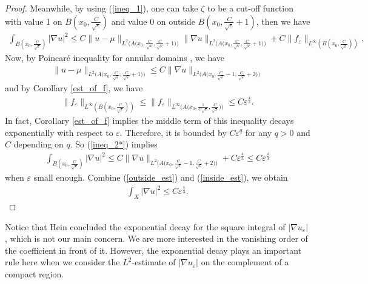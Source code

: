 \documentclass[11pt]{amsart}
\theoremstyle{plain}
\theoremstyle{definition}
\numberwithin{equation}{section}
\renewcommand{\leq}{\leqslant}
\begin{document}
\begin{proof}
Meanwhile, by using (\ref{ineq_1}), one can take $\zeta$ to be a cut-off function with value 1 on $B(x_0,\frac{C}{\sqrt{\varepsilon}})$ and value 0 on outside $B(x_0,\frac{C}{\sqrt{\varepsilon}}+1)$, then we have 
\begin{align}\label{ineq_2*}
\int_{B(x_0,\frac{C}{\sqrt{\varepsilon}})}|\nabla u|^2\leq C\|u-\mu\|_{L^2\big(A\big(x_0,\frac{C}{\sqrt{\varepsilon}},\frac{C}{\sqrt{\varepsilon}}+1\big)\big)}\|\nabla u\|_{L^2\big(A\big(x_0,\frac{C}{\sqrt{\varepsilon}},\frac{C}{\sqrt{\varepsilon}}+1\big)\big)}+C\|f_{\varepsilon}\|_{L^{\infty}(B(x_0,\frac{C}{\sqrt{\varepsilon}}))}.
\end{align}
Now, by Poincar\'e inequality for annular domains \cite[Lemma 2.2]{Hein}, we have
\begin{align}
\|u-\mu\|_{L^2\big(A\big(x_0,\frac{C}{\sqrt{\varepsilon}},\frac{C}{\sqrt{\varepsilon}}+1\big)\big)}\leq C\|\nabla u\|_{L^2\big(A\big(x_0,\frac{C}{\sqrt{\varepsilon}}-1,\frac{C}{\sqrt{\varepsilon}}+2\big)\big)}
\end{align}
and by Corollary \ref{est_of_f}, we have
\begin{align}
\|f_{\varepsilon}\|_{L^{\infty}(B(x_0,\frac{C}{\sqrt{\varepsilon}}))}\leq \|f_{\varepsilon}\|_{L^{\infty}\big(A\big(x_0,\frac{1}{C\sqrt{\varepsilon}},\frac{C}{\sqrt{\varepsilon}}\big)\big)}\leq C\varepsilon^{\frac{4}{3}}.
\end{align}
In fact, Corollary \ref{est_of_f} implies the middle term of this inequality decays exponentially with respect to $\varepsilon$. Therefore, it is bounded by $C\varepsilon^q$ for any $q>0$ and $C$ depending on $q$.
So (\ref{ineq_2*}) implies
\begin{align}\label{inside_est}
\int_{B(x_0,\frac{C}{\sqrt{\varepsilon}})}|\nabla u|^2\leq C\|\nabla u\|_{L^2\big(A\big(x_0,\frac{C}{\sqrt{\varepsilon}}-1,\frac{C}{\sqrt{\varepsilon}}+2\big)\big)}+C\varepsilon^{\frac{4}{3}}\leq C\varepsilon^{\frac{4}{3}}
\end{align}
when $\varepsilon$ small enough. Combine (\ref{outside_est}) and (\ref{inside_est}), we obtain
\begin{align}\label{ineq_3}
\int_{X}|\nabla u|^2\leq C\varepsilon^{\frac{4}{3}}.
\end{align}
\end{proof}
Notice that Hein concluded the exponential decay for the square integral of $|\nabla u_{\varepsilon}|$ \cite{Hein}, which is not our main concern. We are more interested in the vanishing order of the coefficient in front of it. However, the exponential decay plays an important rule here when we consider the $L^2$-estimate of $|\nabla u_{\varepsilon}|$ on the complement of a compact region.
\end{document}
